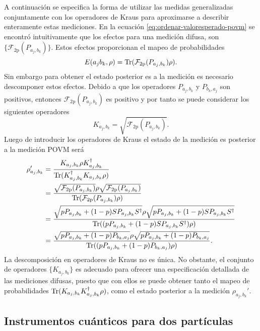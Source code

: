 A continuación se especifica la forma de utilizar las medidas generalizadas conjuntamente con los operadores de Kraus para aproximarse a describir enteramente estas mediciones. En la ecuación {\eqref{eq:ordenar-valoresperado-povm}} se encontró intuitivamente que los efectos para una medición difusa, son $\{\mathcal{F}_{2\text{p}}({P_{a_j,b_k}})\}$. Estos efectos proporcionan el mapeo de probabilidades\begin{equation}\label{eq:mapeo-probabilidades-2p}
    E(a_j b_k, \rho)= {\rm Tr}(\mathcal{F}_{2\text{p}}({P_{a_j,b_k}})\rho).
    \end{equation} Sin embargo para obtener el estado posterior es a la medición es necesario descomponer estos efectos. Debido a que los operadores $P_{a_j,b_k }$ y $P_{b_k,a_j}$ son  positivos, entonces  $\mathcal{F}_{2\text{p}}({P_{a_j,b_k}})$ es positivo y por tanto se puede considerar los siguientes operadores\[K_{a_j,b_k}=\sqrt{\mathcal{F}_{2\text{p}}({P_{a_j,b_k}})}.\] Luego de introducir los operadores de Kraus el
    estado de la medición es posterior a la medición POVM será
    \begin{equation}\label{eq:estado-posterior-povm1-2p}\begin{split}\rho'_{a_j,b_k}&=\dfrac{K_{a_j,b_k} \rho
    K_{a_j,b_k}^\dagger}{{\rm Tr}(K_{a_j,b_k}^\dagger K_{a_j,b_k} \rho)}\\
    &=\dfrac{\sqrt{\mathcal{F}_{2\text{p}}(P_{a_j,b_k})} \rho
    \sqrt{\mathcal{F}_{2\text{p}}({P_{a_j,b_k}})}}{{\rm Tr}(\mathcal{F}_{2\text{p}}({P_{a_j,b_k}}) \rho)}\\
    &=\dfrac{\sqrt{p P_{a_j,b_k}+(1-p)SP_{a_j,b_k}S^\dagger}\rho\sqrt{p P_{a_j,b_k}+(1-p)SP_{a_j,b_k}S^\dagger}}{{\rm Tr}((p P_{a_j,b_k}+(1-p)SP_{a_j,b_k}S^\dagger) \rho)}\\
    &=\dfrac{\sqrt{p P_{a_j,b_k}+(1-p)P_{b_k,a_j}}\rho\sqrt{p P_{a_j,b_k}+(1-p)P_{b_k,a_j}} }{{\rm Tr}((p P_{a_j,b_k}+(1-p)P_{b_k,a_j}) \rho)}.
    \end{split}\end{equation}La descomposición en operadores de Kraus
    no es única. No obstante, el conjunto de operadores $\{K_{a_j,b_k}\}$ es adecuado para ofrecer una especificación detallada de las mediciones difusas, puesto que con ellos se puede obtener tanto el mapeo de probabilidades ${\rm Tr}(K_{a_j,b_k}K_{a_j,b_k}^\dagger \rho)$, como el estado posterior a la medición $\rho_{a_j,b_k}'$.



\subsection{Instrumentos cuánticos para dos partículas}\label{subsec:Instrumentos_cuanticos_2p_3cap} %

